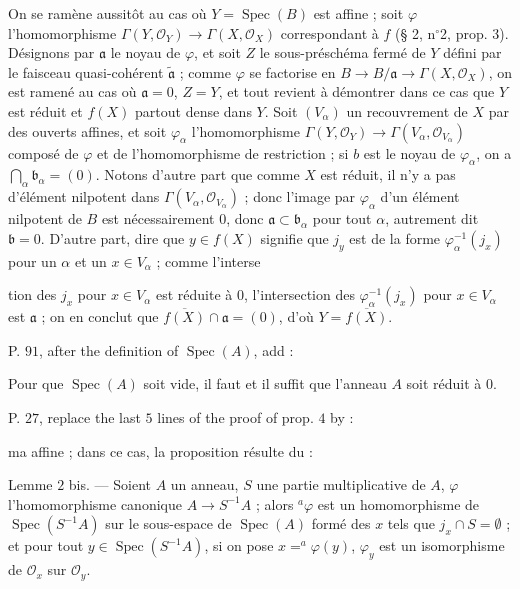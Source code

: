 On se ramène aussitôt au cas où $Y = \operatorname{Spec}(B)$ est affine ; soit $\varphi$ l'homomorphisme $\Gamma(Y, \mathcal{O}_Y) \to \Gamma(X, \mathcal{O}_X)$ correspondant à $f$ (§ 2, n$^\circ$2, prop. 3). Désignons par $\mathfrak{a}$ le noyau de $\varphi$, et soit $Z$ le sous-préschéma fermé de $Y$ défini par le faisceau quasi-cohérent $\tilde{\mathfrak{a}}$ ; comme $\varphi$ se factorise en $B \to B/\mathfrak{a} \to \Gamma(X, \mathcal{O}_X)$, on est ramené au cas où $\mathfrak{a} = 0$, $Z = Y$, et tout revient à démontrer dans ce cas que $Y$ est réduit et $f(X)$ partout dense dans $Y$. Soit $(V_\alpha)$ un recouvrement de $X$ par des ouverts affines, et soit $\varphi_\alpha$ l'homomorphisme $\Gamma(Y, \mathcal{O}_Y) \to \Gamma(V_\alpha, \mathcal{O}_{V_\alpha})$ composé de $\varphi$ et de l'homomorphisme de restriction ; si $b$ est le noyau de $\varphi_\alpha$, on a $\bigcap_\alpha \mathfrak{b}_\alpha = (0)$. Notons d'autre part que comme $X$ est réduit, il n'y a pas d'élément nilpotent dans $\Gamma(V_\alpha, \mathcal{O}_{V_\alpha})$ ; donc l'image par $\varphi_\alpha$ d'un élément nilpotent de $B$ est nécessairement 0, donc $\mathfrak{a} \subset \mathfrak{b}_\alpha$ pour tout $\alpha$, autrement dit $\mathfrak{b} = 0$. D'autre part, dire que $y \in f(X)$ signifie que $j_y$ est de la forme $\varphi_\alpha^{-1}(j_{x})$ pour un $\alpha$ et un $x \in V_\alpha$ ; comme l'interse

\newpage


tion des $j_x$ pour $x \in V_\alpha$ est réduite à $0$, l'intersection des $\varphi_\alpha^{-1}(j_x)$ pour $x \in V_\alpha$ est $\mathfrak{a}$ ; on en conclut que $\overline{f(X)} \cap \mathfrak{a} = (0)$, d'où $Y = \overline{f(X)}$.

P. $91$, after the definition of $\operatorname{Spec}(A)$, add :

Pour que $\operatorname{Spec}(A)$ soit vide, il faut et il suffit que l'anneau $A$ soit réduit à $0$.

P. $27$, replace the last $5$ lines of the proof of prop. $4$ by :

ma affine ; dans ce cas, la proposition résulte du :

Lemme $2$ bis. — Soient $A$ un anneau, $S$ une partie multiplicative de $A$, $\varphi$ l'homomorphisme canonique $A \to S^{-1}A$ ; alors $^a\varphi$ est un homomorphisme de $\operatorname{Spec}(S^{-1}A)$ sur le sous-espace de $\operatorname{Spec}(A)$ formé des $x$ tels que $j_x \cap S = \emptyset$ ; et pour tout $y \in \operatorname{Spec}(S^{-1}A)$, si on pose $x = ^a\varphi(y)$, $\varphi_y$ est un isomorphisme de $\mathcal{O}_x$ sur $\mathcal{O}_y$.

